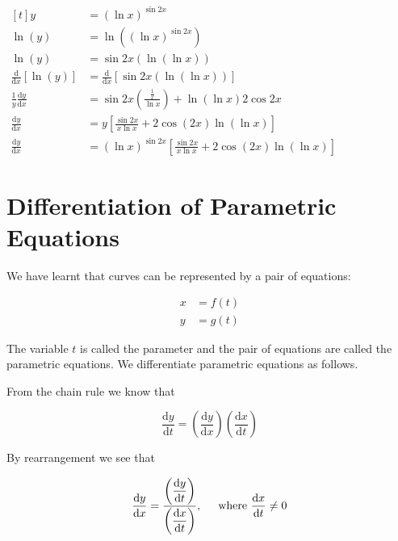 \documentclass[11pt,a4paper]{book}
\begin{document}
\begin{example}
\begin{tasks}[label=(\alph*),label-width=3.5ex,after-item-skip=1.5cm]
\task
$
\begin{aligned}[t]
y & =\left(\ln x\right)^{\sin2x}\\
\ln\left(y\right) & =\ln\left(\left(\ln x\right)^{\sin2x}\right)\\
\ln\left(y\right) & =\sin2x\left(\ln\left(\ln x\right)\right)\\
\frac{\mathrm{d}}{\mathrm{d}x}\left[\ln\left(y\right)\right] & =\frac{\mathrm{d}}{\mathrm{d}x}\left[\sin2x\left(\ln\left(\ln x\right)\right)\right]\\
\frac{1}{y}\frac{\mathrm{d}y}{\mathrm{d}x} & =\sin2x\left(\frac{\frac{1}{x}}{\ln x}\right)+\ln\left(\ln x\right)2\cos2x\\
\frac{\mathrm{d}y}{\mathrm{d}x} & =y\left[\frac{\sin2x}{x\ln x}+2\cos\left(2x\right)\ln\left(\ln x\right)\right]\\
\frac{\mathrm{d}y}{\mathrm{d}x} & =\left(\ln x\right)^{\sin2x}\left[\frac{\sin2x}{x\ln x}+2\cos\left(2x\right)\ln\left(\ln x\right)\right]
\end{aligned}
$

\end{tasks}

\end{example}

\newpage

\section{Differentiation of Parametric Equations}

We have learnt that curves can be represented by a pair of equations:

\begin{align*}
x & =f(t)\\
y & =g(t)
\end{align*}

The variable $t$ is called the parameter and the pair of equations
are called the parametric equations. We differentiate parametric equations
as follows.

\begin{tcolorbox}[colback=blue!5, colframe=black, boxrule=.4pt, sharpish corners]

From the chain rule we know that

\[
\frac{\mathrm{d}y}{\mathrm{d}t}=\left(\frac{\mathrm{d}y}{\mathrm{d}x}\right)\left(\frac{\mathrm{d}x}{\mathrm{d}t}\right)
\]

By rearrangement we see that

\[
\frac{\mathrm{d}y}{\mathrm{d}x}=\frac{\left({\displaystyle \frac{\mathrm{d}y}{\mathrm{d}t}}\right)}{\left({\displaystyle \frac{\mathrm{d}x}{\mathrm{d}t}}\right)},\text{\ensuremath{\hspace{0.5cm}}where \ensuremath{\frac{\mathrm{d}x}{\mathrm{d}t}\neq0}}
\]
\end{tcolorbox}
\end{document}
